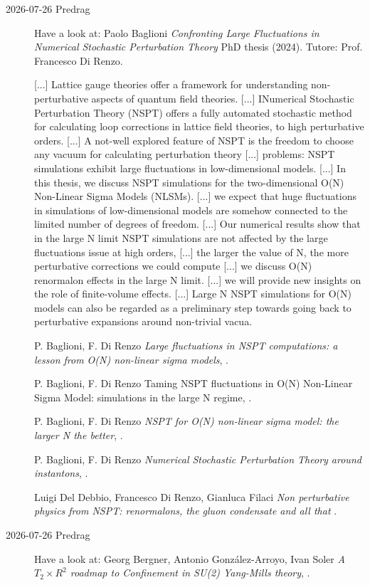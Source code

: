 \begin{description}
\item[2026-07-26 Predrag] Have a look at:
Paolo Baglioni
\emph{Confronting Large Fluctuations in Numerical Stochastic Perturbation Theory}
 {PhD thesis} (2024).
Tutore:
Prof.  {Francesco Di Renzo}.
	
[...] Lattice gauge theories offer a framework for understanding non-perturbative aspects of quantum field theories. 
[...] INumerical Stochastic Perturbation Theory (NSPT)  
offers a fully automated stochastic method for calculating loop corrections in lattice field theories, 
to high perturbative orders. 
[...]
A not-well explored feature of NSPT is the freedom to choose any vacuum for calculating perturbation theory
[...] problems:  NSPT simulations exhibit large fluctuations in low-dimensional models. 
[...]
 In this thesis, we discuss NSPT simulations for the two-dimensional O(N) Non-Linear Sigma Models (NLSMs). 
[...]
we expect that huge fluctuations in simulations of low-dimensional models are somehow connected to the limited number of degrees of freedom. 
[...] Our numerical results show that in the large N limit NSPT simulations are not affected by the large fluctuations issue at high orders, 
[...]
 the larger the value of N, the more perturbative corrections we could compute
 [...]
 we discuss O(N) renormalon effects in the large N limit. 
 [...]
  we will provide new insights on the role of finite-volume effects.
  [...]
  Large N NSPT simulations for O(N) models can also be regarded as a preliminary step towards going back to perturbative expansions around non-trivial vacua. 
  
P. Baglioni, F. Di Renzo 
\emph{Large fluctuations in NSPT computations: a lesson from O(N) non-linear sigma models},
.

P. Baglioni, F. Di Renzo 
{Taming NSPT fluctuations in O(N) Non-Linear Sigma Model: simulations in the large N regime},
 .

P. Baglioni, F. Di Renzo 
\emph{NSPT for O(N) non-linear sigma model: the larger N the better},
.

P. Baglioni, F. Di Renzo 
\emph{Numerical Stochastic Perturbation Theory around instantons},
.

Luigi Del Debbio, Francesco Di Renzo, Gianluca Filaci
\emph{Non perturbative physics from NSPT: renormalons, the gluon condensate and all that}
.

\item[2026-07-26 Predrag] Have a look at:
Georg Bergner, Antonio González-Arroyo, Ivan Soler
\emph{A $T_2×R^2$ roadmap to Confinement in SU(2) Yang-Mills theory},
 .


\end{description}
